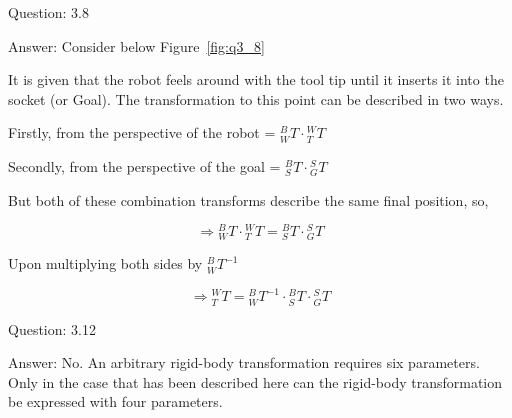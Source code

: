 \documentclass[a4paper]{article}
\begin{document}
\begin{qalist}
		\item[Question: 3.8] \setcounter{equation}{0} %
		\item[Answer:] Consider below Figure~\ref{fig:q3_8} \\
			\begin{minipage}{\linewidth}
				\vspace{0.5cm}
				\centering
				\label{fig:q3_8}
				\vspace{0.5cm}
			\end{minipage}
			It is given that the robot feels around with the tool tip until it inserts it into the socket (or Goal). 
			The transformation to this point can be described in two ways. 
			
			Firstly, from the perspective of the robot = ${}^{B}_{W}T \cdot {}^{W}_{T}T$
			
			Secondly, from the perspective of the goal = ${}^{B}_{S}T \cdot {}^{S}_{G}T$
			
			But both of these combination transforms describe the same final position, so,
			
			\[\Rightarrow {}^{B}_{W}T \cdot {}^{W}_{T}T = {}^{B}_{S}T \cdot {}^{S}_{G}T\]
			
			Upon multiplying both sides by ${}^{B}_{W}{T}^{-1}$
			
			\[\Rightarrow {}^{W}_{T}T = {}^{B}_{W}{T}^{-1} \cdot {}^{B}_{S}T \cdot {}^{S}_{G}T\]
		
		\item[Question: 3.12] \setcounter{equation}{0} %
		\item[Answer:] No. An arbitrary rigid-body transformation requires six parameters. Only in the case that has been described here can the rigid-body transformation be expressed with four parameters.
		

\end{qalist}
\end{document}
